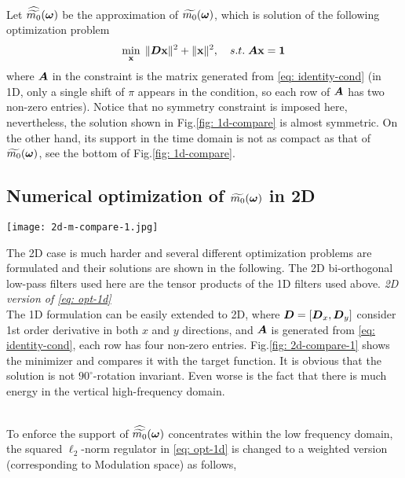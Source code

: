 Let $\widehat{\widetilde{m_{0}}}(\boldsymbol{\omega})$ be the approximation of $\widetilde{m_{0}}(\boldsymbol{\omega})$, which is solution of the following optimization problem
\begin{align}
\min_{\mathbf{x}}\; \Vert \boldsymbol{D}\mathbf{x}\Vert^2 + \Vert \mathbf{x}\Vert^2,\quad s.t. \; \boldsymbol{A}\mathbf{x} = \mathbf{1} \label{eq: opt-1d}
\end{align}
where $\boldsymbol{A}$ in the constraint is the matrix generated from \eqref{eq: identity-cond} (in 1D, only a single shift of $\pi$ appears in the condition, so each row of $\boldsymbol{A}$ has two non-zero entries). Notice that no symmetry constraint is imposed here, nevertheless, the solution shown in Fig.\ref{fig: 1d-compare} is almost symmetric. On the other hand, its support in the time domain is not as compact as that of $\widetilde{m_{0}}(\boldsymbol{\omega})$, see the bottom of Fig.\ref{fig: 1d-compare}.

\subsection{Numerical optimization of $\widetilde{m_{0}}(\boldsymbol{\omega})$ in 2D}
\begin{minipage}[c]{.45\textwidth}
\centering
\texttt{[image: 2d-m-compare-1.jpg]}
\label{fig: 2d-compare-1}
\end{minipage}
\hfill
\begin{minipage}[c]{.5\textwidth}
The 2D case is much harder and several different optimization problems are formulated and their solutions are shown in the following. The 2D bi-orthogonal low-pass filters used here are the tensor products of the 1D filters used above.
{\it 2D version of \eqref{eq: opt-1d}}\\
 The 1D formulation can be easily extended to 2D, where $\boldsymbol{D} = [\boldsymbol{D}_x,\boldsymbol{D}_y]$ consider 1st order derivative in both $x$ and $y$ directions, and $\boldsymbol{A}$ is generated from \eqref{eq: identity-cond}, each row has four non-zero entries. Fig.\ref{fig: 2d-compare-1} shows the minimizer and compares it with the target function. It is obvious that the solution is not $90^\circ$-rotation invariant. Even worse is the fact that there is much energy in the vertical high-frequency domain.
\end{minipage}
\\[1em]
To enforce the support of $\widehat{\widetilde{m_{0}}}(\boldsymbol{\omega})$ concentrates within the low frequency domain, the squared $\ell_2$-norm regulator in \eqref{eq: opt-1d} is changed to a weighted version (corresponding to Modulation space) as follows,
